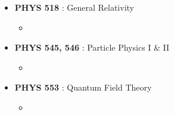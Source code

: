 \documentclass[10pt,a4paper,ragged2e]{altacv}
\begin{document}
\begin{itemize}
\begin{itemize}
  \item 
  \end{itemize}
\item \textbf{PHYS 518} : General Relativity
  \begin{itemize}
  \item 
  \end{itemize}
\item \textbf{PHYS 545, 546} : Particle Physics I \& II
  \begin{itemize}
  \item 
  \end{itemize}
\item \textbf{PHYS 553} : Quantum Field Theory
  \begin{itemize}
  \item 
  \end{itemize}
\end{itemize}
\end{document}
